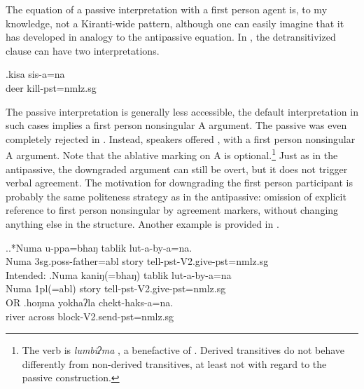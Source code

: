 The equation of a passive interpretation with a first person agent is, to my knowledge, not a Kiranti-wide pattern, although one can easily imagine that it has developed in analogy to the antipassive equation. In \Next, the detransitivized clause  can have two interpretations. 

\exg.kisa sis-a=na\\
deer kill{\sc [3sg]-pst=nmlz.sg}\\
 

The passive interpretation is generally less accessible, the default interpretation in such cases implies a first person nonsingular A argument. The passive was even completely rejected in \Next[a]. Instead, speakers  offered \Next[b], with a first person nonsingular A argument. Note that the ablative marking on A is optional.\footnote{The verb is \emph{lumbiʔma} , a benefactive of . Derived transitives do not behave differently from non-derived transitives, at least not with regard to the passive construction.} Just as in the antipassive, the downgraded argument can still be overt, but it does not trigger verbal agreement. The motivation for downgrading the first person participant is  probably the same politeness strategy as in the antipassive: omission of explicit reference to first person nonsingular by agreement markers, without changing anything else in the structure. Another example is provided in \Next[c].  


\ex.\ag.*Numa u-ppa=bhaŋ tablik lut-a-by-a=na.\\
Numa {\sc 3sg.poss-}father{\sc =abl} story tell{\sc [3sg]-pst-V2.give-pst=nmlz.sg}\\
Intended: 
\bg.Numa kaniŋ(=bhaŋ) tablik lut-a-by-a=na\\
Numa  {\sc 1pl(=abl)} story tell{\sc [3sg]-pst-V2.give-pst=nmlz.sg}\\
 OR 
\bg.hoŋma  yokhaʔla chekt-haks-a=na.\\
river across block{\sc [3sg]-V2.send-pst=nmlz.sg} \\


